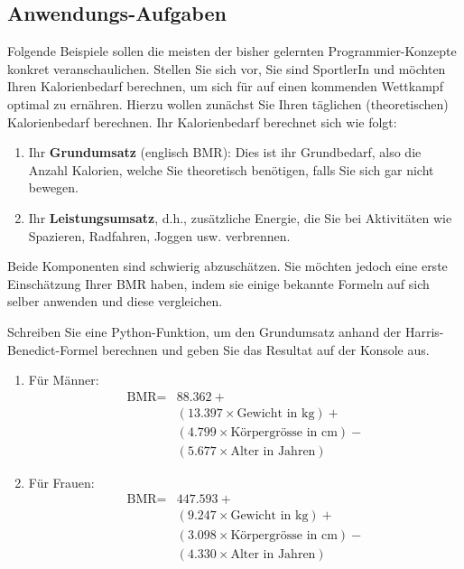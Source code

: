 \subsection{Anwendungs-Aufgaben}

Folgende Beispiele sollen die meisten der bisher gelernten Programmier-Konzepte konkret veranschaulichen. Stellen Sie sich vor, Sie sind SportlerIn und möchten Ihren Kalorienbedarf berechnen, um sich für auf einen kommenden Wettkampf optimal zu ernähren. Hierzu wollen zunächst Sie Ihren täglichen (theoretischen) Kalorienbedarf berechnen. Ihr Kalorienbedarf berechnet sich wie folgt:
\begin{enumerate}
	\item Ihr \textbf{Grundumsatz} (englisch \gls{BMR}): Dies ist ihr Grundbedarf, also die Anzahl Kalorien, welche Sie theoretisch benötigen, falls Sie sich gar nicht bewegen.
	\item Ihr \textbf{Leistungsumsatz}, d.h., zusätzliche Energie, die Sie bei Aktivitäten wie Spazieren, Radfahren, Joggen usw. verbrennen.
\end{enumerate}

Beide Komponenten sind schwierig abzuschätzen. Sie möchten jedoch eine erste Einschätzung Ihrer \gls{BMR} haben, indem sie einige bekannte Formeln auf sich selber anwenden und diese vergleichen.

\begin{mysubmission}\label{ex:bmr-simple}
	Schreiben Sie eine Python-Funktion, um den Grundumsatz anhand der Harris-Benedict-Formel berechnen und geben Sie das Resultat auf der Konsole aus.
	\begin{enumerate}
		\item Für Männer:
		      \begin{align*}
			      \text{BMR} = & 88.362 +                                   \\
			                   & (13.397 \times \text{Gewicht in kg}) +     \\
			                   & (4.799 \times \text{Körpergrösse in cm}) - \\
			                   & (5.677 \times \text{Alter in Jahren})
		      \end{align*}
		\item Für Frauen:
		      \begin{align*}
			      \text{BMR} = & 447.593  +                                 \\
			                   & (9.247 \times \text{Gewicht in kg}) +      \\
			                   & (3.098 \times \text{Körpergrösse in cm}) - \\
			                   & (4.330 \times \text{Alter in Jahren})
		      \end{align*}
	\end{enumerate}
	\begin{myanswer}
		
	\end{myanswer}
\end{mysubmission}

